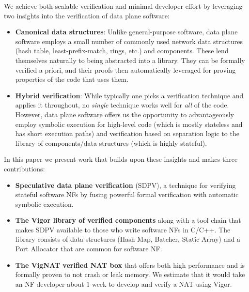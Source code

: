 \documentclass[letterpaper,twocolumn,10pt]{article}
\newcommand{\vignat}{{\sc VigNAT}\xspace}
\begin{document}
We achieve both scalable verification and minimal developer effort by leveraging two insights into the verification of data plane software:
\begin{itemize}
    \item {\bf Canonical data structures}: Unlike general-purpose software, data plane software employs a small number of commonly used network data structures (hash table, least-prefix-match, rings, etc.) and components. These lend themselves naturally to being abstracted into a library. They can be formally verified a priori, and their proofs then automatically leveraged for proving properties of the code that uses them.
    \item {\bf Hybrid verification}: While typically one picks a verification
      technique and applies it throughout, no {\em single} technique works well for {\em all} of the code. However, data plane software offers us the opportunity to advantageously employ symbolic execution for high-level code (which is mostly stateless and has short execution paths) and verification based on separation logic to the library of components/data structures (which is highly stateful).
     
\end{itemize}

In this paper we present work that builds upon these insights and makes three contributions:
\begin{itemize}
    \item {\bf Speculative data plane verification} (SDPV), a technique for verifying stateful software NFs by fusing powerful formal verification with automatic symbolic execution. %
    \item {\bf The Vigor library of verified components} along with a tool chain
      that makes SDPV available to those who write software NFs in C/C++.
      The library consists of data structures (Hash Map, Batcher, Static Array) and a Port Allocator that are common for software NF. %
    \item {\bf The \vignat verified NAT box} that offers both high performance and is formally proven to not crash or leak memory. We estimate that it would take an NF developer about 1 week to develop and verify a NAT using Vigor.
\end{itemize}
\end{document}
